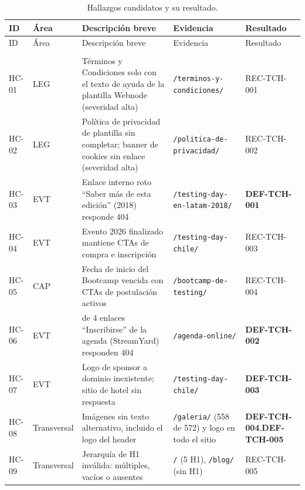\documentclass[11pt,a4paper]{article}
\newcommand{\upath}[1]{\nolinkurl{#1}}
\begin{document}
{\small
\setlength{\tabcolsep}{4pt}
\begin{longtable}{@{}>{\raggedright\arraybackslash}p{1.05cm}
  >{\raggedright\arraybackslash}p{1.8cm}
  >{\raggedright\arraybackslash}p{5.4cm}
  >{\raggedright\arraybackslash}p{4.1cm}
  >{\raggedright\arraybackslash}p{2.4cm}@{}}
\caption{Hallazgos candidatos y su resultado.}\\
\toprule
ID & Área & Descripción breve & Evidencia & Resultado \\
\midrule
\endfirsthead
\toprule
ID & Área & Descripción breve & Evidencia & Resultado \\
\midrule
\endhead
\midrule
\multicolumn{5}{r}{\footnotesize\color{muted}Continúa en la página siguiente}\\
\endfoot
\bottomrule
\endlastfoot
\mbox{HC-01} & LEG & Términos y Condiciones solo con el texto de ayuda de la plantilla Webnode
  (severidad alta) & \upath{/terminos-y-condiciones/} & \mbox{REC-TCH-001} \\
\mbox{HC-02} & LEG & Política de privacidad de plantilla sin completar; banner de cookies sin
  enlace (severidad alta) & \upath{/politica-de-privacidad/} & \mbox{REC-TCH-002} \\
\mbox{HC-03} & EVT & Enlace interno roto ``Saber más de esta edición'' (2018) responde 404 &
  \upath{/testing-day-en-latam-2018/} & \textbf{DEF-TCH-001} \\
\mbox{HC-04} & EVT & Evento 2026 finalizado mantiene CTAs de compra e inscripción &
  \upath{/testing-day-chile/} & \mbox{REC-TCH-003} \\
\mbox{HC-05} & CAP & Fecha de inicio del Bootcamp vencida con CTAs de postulación activos &
  \upath{/bootcamp-de-testing/} & \mbox{REC-TCH-004} \\
\mbox{HC-06} & EVT & 3 de 4 enlaces ``Inscribirse'' de la agenda (StreamYard) responden 404 &
  \upath{/agenda-online/} & \textbf{DEF-TCH-002} \\
\mbox{HC-07} & EVT & Logo de sponsor a dominio inexistente; sitio de hotel sin respuesta &
  \upath{/testing-day-chile/} & \textbf{DEF-TCH-003} \\
\mbox{HC-08} & Transversal & Imágenes sin texto alternativo, incluido el logo del header &
  \upath{/galeria/} (558 de 572) y logo en todo el sitio & \mbox{\textbf{DEF-TCH-004},}\newline \mbox{\textbf{DEF-TCH-005}} \\
\mbox{HC-09} & Transversal & Jerarquía de H1 inválida: múltiples, vacíos o ausentes &
  \upath{/} (5 H1), \upath{/blog/} (sin H1) & \mbox{REC-TCH-005} \\

\end{longtable}}
\end{document}
